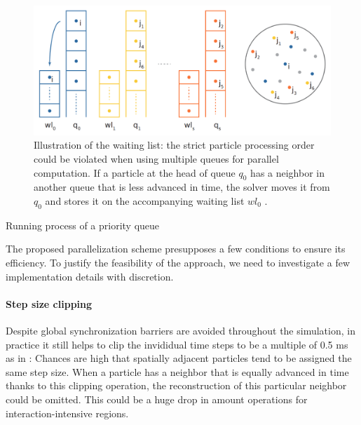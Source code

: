 \documentclass[
	11pt, 
	DIV10,
	ngerman,
	a4paper, 
	oneside, 
	headings=normal, 
	captions=tableheading,
	final, 
	numbers=noenddot
]{scrartcl}
\begin{document}
\begin{figure}[tb]
	\centering
	\includegraphics[scale=0.25]{images/6}
	\caption{\label{fig5} Illustration of the waiting list: the strict particle processing order could be violated when using multiple queues for parallel computation. If a particle at the head of queue $ q_{0} $ has a neighbor in another queue that is less advanced in time, the solver moves it from $ q_{0} $ and stores it on the accompanying waiting list $ wl_{0} $ \cite{reinhardt2017fully}.}
\end{figure}

\large
\begin{algorithm}
	\DontPrintSemicolon
	\SetAlgoLined
	\SetAlCapNameFnt{\large}
	\SetAlCapFnt{\large}
	\caption{\label{alg3} Running process of a priority queue \cite{reinhardt2017fully}}
\end{algorithm}
\normalsize

The proposed parallelization scheme presupposes a few conditions to ensure its efficiency. To justify the feasibility of the approach, we need to investigate a few implementation details with discretion.

\paragraph{Step size clipping}
Despite global synchronization barriers are avoided throughout the simulation, in practice it still helps to clip the invididual time steps to be a multiple of 0.5 ms as in \cite{goswami2014regional}: Chances are high that spatially adjacent particles tend to be assigned the same step size. When a particle has a neighbor that is equally advanced in time thanks to this clipping operation, the reconstruction of this particular neighbor could be omitted. This could be a huge drop in amount operations for interaction-intensive regions.
\end{document}
